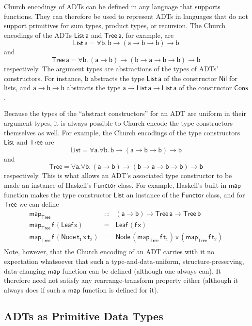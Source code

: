 \documentclass[acmsmall,screen,review,anonymous]{acmart}
\theoremstyle{definition}
\begin{document}
Church encodings of ADTs can be defined in any language that supports
functions. They can therefore be used to represent ADTs in languages
that do not support primitives for sum types, product types, or
recursion. The Church encodings of the ADTs $\mathsf{List\,a}$ and
$\mathsf{Tree\,a}$, for example, are
\[\mathsf{List\,a} = \mathsf{\forall b.\,b \to (a \to b \to b) \to b}\]
and 
\[\mathsf{Tree\,a} = \mathsf{\forall b.\,(a \to b) \to (b \to a \to b
  \to b) \to b}\] respectively. The argument types are abstractions of
the types of ADTs' constructors. For instance, $\mathsf{b}$ abstracts
the type $\mathsf{List\,a}$ of the constructor $\mathsf{Nil}$ for
lists, and $\mathsf{a \to b \to b}$ abstracts the type $\mathsf{a \to
  List\,a \to List\,a}$ of the constructor $\mathsf{Cons}$.

Because the types of the ``abstract constructors'' for an ADT are
uniform in their argument types, it is always possible to Church
encode the type constructors themselves as well. For example, the
Church encodings of the type constructors $\mathsf{List}$ and
$\mathsf{Tree}$ are
\[\mathsf{List} = \mathsf{\forall a. \forall b.\,b \to (a \to b \to b)
  \to b}\] 
and 
\[\mathsf{Tree} = \mathsf{\forall a. \forall b.\,(a \to b) \to (b \to
  a \to b \to b) \to b}\] respectively. This is what allows an ADT's
associated type constructor to be made an instance of Haskell's
$\mathsf{Functor}$ class. For example, Haskell's built-in
$\mathsf{map}$ function makes the type constructor $\mathsf{List}$ an
instance of the $\mathsf{Functor}$ class, and for $\mathsf{Tree}$ we
can define
\[\begin{array}{lll}
\mathsf{map_{Tree}} & \mathsf{::} & \mathsf{(a \to b) \to Tree\,a \to Tree \,b}\\
\mathsf{map_{Tree}\, f\, (Leaf\,x)} & \mathsf{=} & \mathsf{Leaf\,(f\,x)}\\
\mathsf{map_{Tree}\, f\, (Node\,t_1\,x\,t_2)} & \mathsf{=} &
\mathsf{Node\,(map_{Tree}\, f \,t_1)\,x\,(map_{Tree}\,f\,t_2)}\\
\end{array}\]
Note, however, that the Church encoding of an ADT carries with it no
expectation whatsoever that such a type-and-data-uniform,
structure-preserving, data-changing $\mathsf{map}$ function can be
defined (although one always can). It therefore need not satisfy any
rearrange-transform property either (although it always does if such a
$\mathsf{map}$ function is defined for it).

\subsection{ADTs as Primitive Data Types}
\end{document}
